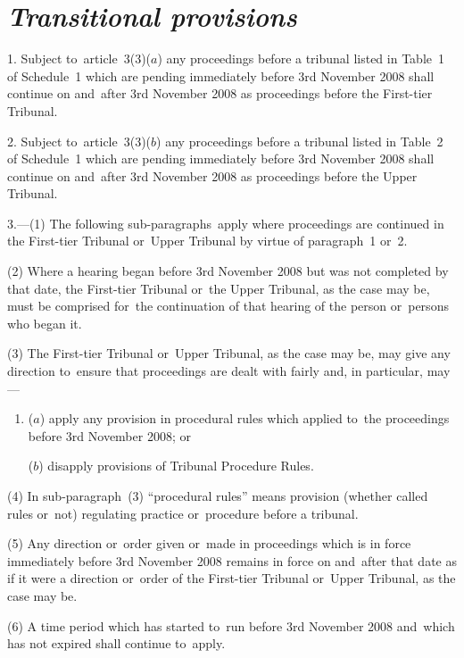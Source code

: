 \documentclass[12pt,a4paper]{article}
\begin{document}
\renewcommand\parthead{--- Schedule~4}

\section*{\itshape Transitional provisions}

1.  Subject to~article~3(3)($a$)  any proceedings before a tribunal listed in Table~1 of Schedule~1 which are pending immediately before 3rd November 2008 shall continue on and~after 3rd November 2008 as proceedings before the First-tier Tribunal.

\medskip

2.  Subject to~article~3(3)($b$)  any proceedings before a tribunal listed in Table~2 of Schedule~1 which are pending immediately before 3rd November 2008 shall continue on and~after 3rd November 2008 as proceedings before the Upper Tribunal.

\medskip

3.---(1)  The following sub-paragraphs~apply where proceedings are continued in the First-tier Tribunal or~Upper Tribunal by virtue of paragraph~1 or~2.

(2) Where a hearing began before 3rd November 2008 but was not completed by that date, the First-tier Tribunal or~the Upper Tribunal, as the case may be, must be comprised for~the continuation of that hearing of the person or~persons who began it.

(3) The First-tier Tribunal or~Upper Tribunal, as the case may be, may give any direction to~ensure that proceedings are dealt with fairly and, in particular, may—
\begin{enumerate}\item[]
($a$) apply any provision in procedural rules which applied to~the proceedings before 3rd November 2008; or

($b$) disapply provisions of Tribunal Procedure Rules.
\end{enumerate}

(4) In sub-paragraph~(3) “procedural rules” means provision (whether called rules or~not) regulating practice or~procedure before a tribunal.

(5) Any direction or~order given or~made in proceedings which is in force immediately before 3rd November 2008 remains in force on and~after that date as if it were a direction or~order of the First-tier Tribunal or~Upper Tribunal, as the case may be.

(6) A time period which has started to~run before 3rd November 2008 and~which has not expired shall continue to~apply.
\end{document}

